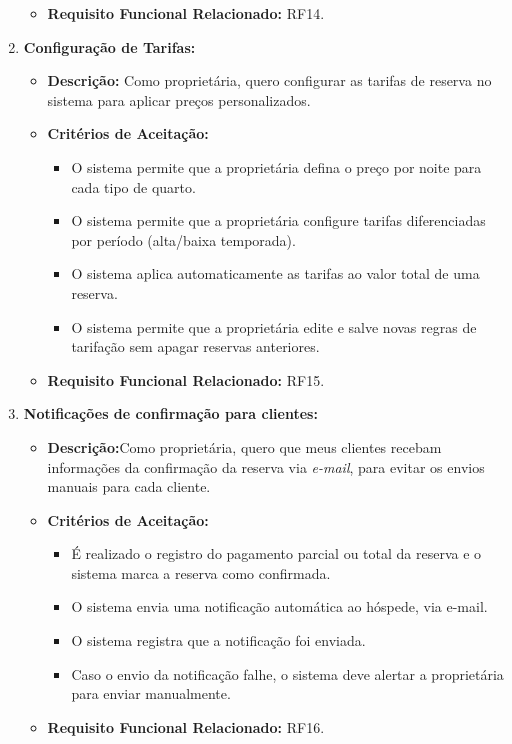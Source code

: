 \documentclass[
	12pt,				%
	openany,			%
	oneside,			%
	a4paper,			%
	english,			%
	french,				%
	spanish,			%
	brazil				%
	]{abntex2}
\begin{document}
\begin{enumerate}[label=\textbf{\arabic*.}]
\begin{itemize}
\begin{itemize}
		\end{itemize}
		\item \textbf{Requisito Funcional Relacionado:} RF14.
	\end{itemize} 
	\item \textbf{Configuração de Tarifas:}
	\begin{itemize}
		\item \textbf{Descrição:} Como proprietária, quero configurar as tarifas de reserva no sistema para aplicar preços personalizados.
		\item \textbf{Critérios de Aceitação:}
		\begin{itemize}
			\item O sistema permite que a proprietária defina o preço por noite para cada tipo de quarto.
			\item O sistema permite que a proprietária configure tarifas diferenciadas por período (alta/baixa temporada).
			\item O sistema aplica automaticamente as tarifas ao valor total de uma reserva.
			\item O sistema permite que a proprietária edite e salve novas regras de tarifação sem apagar reservas anteriores.
		\end{itemize}
		\item \textbf{Requisito Funcional Relacionado:} RF15.
	\end{itemize} 
	\item \textbf{Notificações de confirmação para clientes:}
	\begin{itemize}
		\item \textbf{Descrição:}Como proprietária, quero que meus clientes recebam informações da confirmação da reserva via \textit{e-mail}, para evitar os envios manuais para cada cliente. 
		\item \textbf{Critérios de Aceitação:}
		\begin{itemize}
			\item É realizado o registro do pagamento parcial ou total da reserva e o sistema marca a reserva como confirmada.
			\item O sistema envia  uma notificação automática ao hóspede, via e-mail.
			\item O sistema registra que a notificação foi enviada.
			\item Caso o envio da notificação falhe, o sistema deve alertar a proprietária para enviar manualmente.
		\end{itemize}
		\item \textbf{Requisito Funcional Relacionado:} RF16.

\end{itemize}
\end{enumerate}
\end{document}
